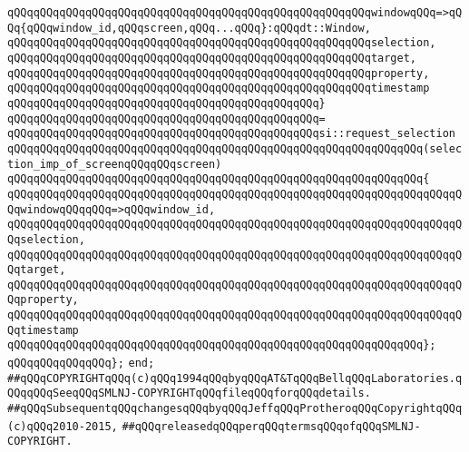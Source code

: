 \verb|qQQqqQQqqQQqqQQqqQQqqQQqqQQqqQQqqQQqqQQqqQQqqQQqqQQqqQQqwindowqQQq=>qQQq{qQQqwindow_id,qQQqscreen,qQQq...qQQq}:qQQqdt::Window,|\newline
\verb|qQQqqQQqqQQqqQQqqQQqqQQqqQQqqQQqqQQqqQQqqQQqqQQqqQQqqQQqselection,|\newline
\verb|qQQqqQQqqQQqqQQqqQQqqQQqqQQqqQQqqQQqqQQqqQQqqQQqqQQqqQQqtarget,|\newline
\verb|qQQqqQQqqQQqqQQqqQQqqQQqqQQqqQQqqQQqqQQqqQQqqQQqqQQqqQQqproperty,|\newline
\verb|qQQqqQQqqQQqqQQqqQQqqQQqqQQqqQQqqQQqqQQqqQQqqQQqqQQqqQQqtimestamp|\newline
\verb|qQQqqQQqqQQqqQQqqQQqqQQqqQQqqQQqqQQqqQQqqQQqqQQq}|\newline
\verb|qQQqqQQqqQQqqQQqqQQqqQQqqQQqqQQqqQQqqQQqqQQqqQQq=|\newline
\verb|qQQqqQQqqQQqqQQqqQQqqQQqqQQqqQQqqQQqqQQqqQQqqQQqsi::request_selection|\newline
\verb|qQQqqQQqqQQqqQQqqQQqqQQqqQQqqQQqqQQqqQQqqQQqqQQqqQQqqQQqqQQqqQQq(selection_imp_of_screenqQQqqQQqscreen)|\newline
\verb|qQQqqQQqqQQqqQQqqQQqqQQqqQQqqQQqqQQqqQQqqQQqqQQqqQQqqQQqqQQqqQQq{|\newline
\verb|qQQqqQQqqQQqqQQqqQQqqQQqqQQqqQQqqQQqqQQqqQQqqQQqqQQqqQQqqQQqqQQqqQQqqQQqwindowqQQqqQQq=>qQQqwindow_id,|\newline
\verb|qQQqqQQqqQQqqQQqqQQqqQQqqQQqqQQqqQQqqQQqqQQqqQQqqQQqqQQqqQQqqQQqqQQqqQQqselection,|\newline
\verb|qQQqqQQqqQQqqQQqqQQqqQQqqQQqqQQqqQQqqQQqqQQqqQQqqQQqqQQqqQQqqQQqqQQqqQQqtarget,|\newline
\verb|qQQqqQQqqQQqqQQqqQQqqQQqqQQqqQQqqQQqqQQqqQQqqQQqqQQqqQQqqQQqqQQqqQQqqQQqproperty,|\newline
\verb|qQQqqQQqqQQqqQQqqQQqqQQqqQQqqQQqqQQqqQQqqQQqqQQqqQQqqQQqqQQqqQQqqQQqqQQqtimestamp|\newline
\verb|qQQqqQQqqQQqqQQqqQQqqQQqqQQqqQQqqQQqqQQqqQQqqQQqqQQqqQQqqQQqqQQq};|\newline
\verb|qQQqqQQqqQQqqQQq};|\newline
\newline
\verb|end;|\newline
\newline
\newline
\verb|##qQQqCOPYRIGHTqQQq(c)qQQq1994qQQqbyqQQqAT&TqQQqBellqQQqLaboratories.qQQqqQQqSeeqQQqSMLNJ-COPYRIGHTqQQqfileqQQqforqQQqdetails.|\newline
\verb|##qQQqSubsequentqQQqchangesqQQqbyqQQqJeffqQQqProtheroqQQqCopyrightqQQq(c)qQQq2010-2015,|\newline
\verb|##qQQqreleasedqQQqperqQQqtermsqQQqofqQQqSMLNJ-COPYRIGHT.|\newline

